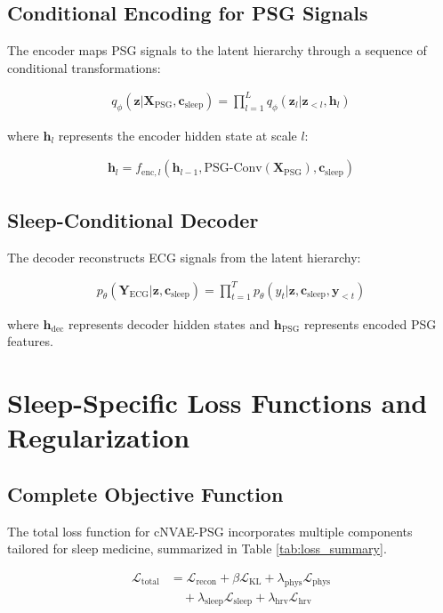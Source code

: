 \documentclass[11pt,en]{elegantpaper}
\begin{document}
\subsection{Conditional Encoding for PSG Signals}

The encoder maps PSG signals to the latent hierarchy through a sequence of conditional transformations:

\begin{align}
q_\phi(\mathbf{z} | \mathbf{X}_{\text{PSG}}, \mathbf{c}_{\text{sleep}}) = \prod_{l=1}^L q_\phi(\mathbf{z}_l | \mathbf{z}_{<l}, \mathbf{h}_l)
\end{align}

where $\mathbf{h}_l$ represents the encoder hidden state at scale $l$:

\begin{align}
\mathbf{h}_l = f_{\text{enc},l}(\mathbf{h}_{l-1}, \text{PSG-Conv}(\mathbf{X}_{\text{PSG}}), \mathbf{c}_{\text{sleep}})
\end{align}

\subsection{Sleep-Conditional Decoder}

The decoder reconstructs ECG signals from the latent hierarchy:

\begin{align}
p_\theta(\mathbf{Y}_{\text{ECG}} | \mathbf{z}, \mathbf{c}_{\text{sleep}}) = \prod_{t=1}^T p_\theta(y_t | \mathbf{z}, \mathbf{c}_{\text{sleep}}, \mathbf{y}_{<t})
\end{align}

where $\mathbf{h}_{\text{dec}}$ represents decoder hidden states and $\mathbf{h}_{\text{PSG}}$ represents encoded PSG features.

\section{Sleep-Specific Loss Functions and Regularization}

\subsection{Complete Objective Function}

The total loss function for cNVAE-PSG incorporates multiple components tailored for sleep medicine, summarized in Table \ref{tab:loss_summary}.

\begin{align}
\mathcal{L}_{\text{total}} &= \mathcal{L}_{\text{recon}} + \beta \mathcal{L}_{\text{KL}} + \lambda_{\text{phys}} \mathcal{L}_{\text{phys}} \\
&\quad + \lambda_{\text{sleep}} \mathcal{L}_{\text{sleep}} + \lambda_{\text{hrv}} \mathcal{L}_{\text{hrv}}
\end{align}
\end{document}
